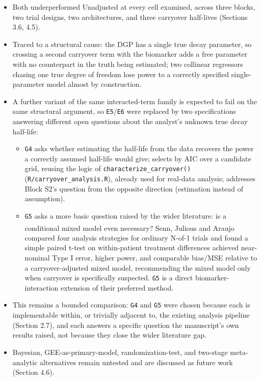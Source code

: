 \documentclass[
  11pt,
]{article}
\providecommand{\tightlist}{%
  \setlength{\itemsep}{0pt}\setlength{\parskip}{0pt}}
\begin{document}
\begin{itemize}
  \begin{itemize}
  \tightlist
  \item
    \texttt{E5}: a lagged term crossed with \texttt{bm}.
  \item
    \texttt{E6}: a continuous elapsed-time term crossed with \texttt{bm}.
  \end{itemize}
\item
  Both underperformed Unadjusted at every cell examined, across three
  blocks, two trial designs, two architectures, and three carryover
  half-lives (Sections 3.6, 4.5).
\item
  Traced to a structural cause: the DGP has a single true decay
  parameter, so crossing a second carryover term with the biomarker
  adds a free parameter with no counterpart in the truth being
  estimated; two collinear regressors chasing one true degree of
  freedom lose power to a correctly specified single-parameter model
  almost by construction.
\item
  A further variant of the same interacted-term family is expected to
  fail on the same structural argument, so \texttt{E5}/\texttt{E6} were replaced by
  two specifications answering different open questions about the
  analyst's unknown true decay half-life:

  \begin{itemize}
  \tightlist
  \item
    \texttt{G4} asks whether estimating the half-life from the data recovers
    the power a correctly assumed half-life would give; selects by
    AIC over a candidate grid, reusing the logic of
    \texttt{characterize\_carryover()} (\texttt{R/carryover\_analysis.R}), already
    used for real-data analysis; addresses Block S2's question from
    the opposite direction (estimation instead of assumption).
  \item
    \texttt{G5} asks a more basic question raised by the wider literature:
    is a conditional mixed model even necessary? Senn, Julious and
    Araujo\textsuperscript{} compared four analysis strategies for
    ordinary N-of-1 trials and found a simple paired t-test on
    within-patient treatment differences achieved near-nominal Type I
    error, higher power, and comparable bias/MSE relative to a
    carryover-adjusted mixed model, recommending the mixed model only
    when carryover is specifically suspected. \texttt{G5} is a direct
    biomarker-interaction extension of their preferred method.
  \end{itemize}
\item
  This remains a bounded comparison: \texttt{G4} and \texttt{G5} were chosen because
  each is implementable within, or trivially adjacent to, the
  existing analysis pipeline (Section 2.7), and each answers a
  specific question the manuscript's own results raised, not because
  they close the wider literature gap.
\item
  Bayesian, GEE-as-primary-model, randomization-test, and two-stage
  meta-analytic alternatives remain untested and are discussed as
  future work (Section 4.6).
\end{itemize}
\end{document}
